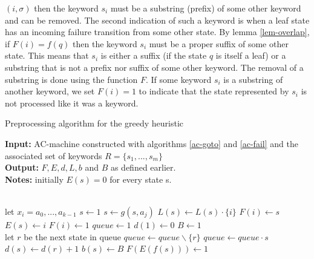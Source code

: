 \documentclass[english,twoside,censored,csm,algorithms-track-2020]{HYthesisML}
\theoremstyle{plain}
\theoremstyle{definition}
\begin{document}
$(i,\sigma)$ then the keyword $s_i$ must be a substring (prefix)  of some other keyword and can be
removed. The second indication of such a keyword is when a leaf state has an incoming failure
transition from some other state. By lemma \ref{lem-overlap}, if $F(i) = f(q)$ then the keyword
$s_i$ must be a proper suffix of some other state. This means that $s_i$ is either a suffix
(if the state $q$ is itself a leaf) or a substring that is not a prefix nor suffix of some other
keyword. The removal of a substring is done using the function $F$. If some keyword
$s_i$ is a substring of another keyword, we set $F(i)=1$ to indicate that the state represented
by $s_i$ is not processed like it was a keyword.

  \begin{algorithm}[h!]

    \caption{Preprocessing algorithm for the greedy heuristic} \label{ukk-pre}
    \hspace*{\algorithmicindent} \textbf{Input:} AC-machine constructed with algorithms \ref{ac-goto} and \ref{ac-fail} and the associated set of keywords $R=\{s_1,...,s_m\}$ \\
    \hspace*{\algorithmicindent} \textbf{Output:} $F, E, d, L, b$ and $B$ as defined earlier.\\
    \hspace*{\algorithmicindent} \textbf{Notes:} initially $E(s) = 0$ for every state s.
    
    \begin{algorithmic}[1]
         \\
          \hspace*{1.1cm plus \algorithmicindent} let $x_i = a_0,...,a_{k-1}$
          \State $s\gets 1$
            \State $s\gets g(s,a_j)$
            \State $L(s)\gets L(s) \cdot \{i\}$
              \State $F(i)\gets s$
              \State $E(s)\gets i$
                \State $F(i)\gets 1$
              \EndIf
            \EndIf
          \EndFor
        \EndFor
        \State $queue\gets 1$
        \State $d(1)\gets 0$
        \State $B\gets 1$
        \\
          \hspace*{1.1cm plus \algorithmicindent} let $r$ be the next state in queue
          \State $queue\gets queue \backslash \{r\}$
            \State $queue\gets queue\cdot s$
            \State $d(s)\gets d(r)+1$
            \State $b(s)\gets B$
            \State $F(E(f(s)))\gets 1$
          \EndFor
        \EndWhile
      \EndFunction
        
    \end{algorithmic}
  \end{algorithm}
\end{document}
